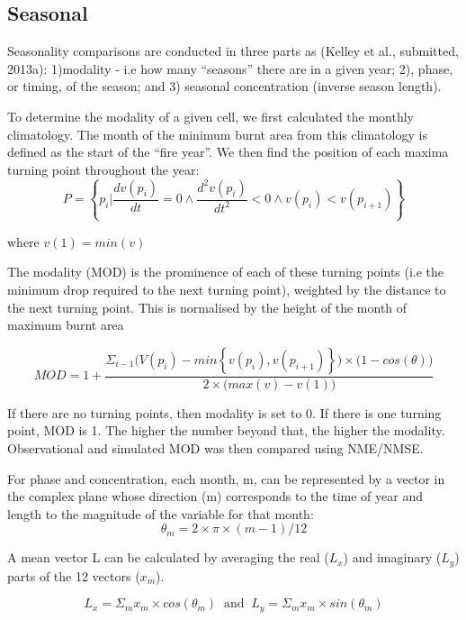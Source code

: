 \documentclass[bg, manuscript]{copernicus}
\begin{document}
\subsection{Seasonal}
Seasonality comparisons are conducted in three parts as  (Kelley et al., submitted, 2013a): 1)modality - i.e how many “seasons” there are in a given year; 2), phase, or timing, of the season; and 3) seasonal concentration (inverse season length).

To determine the modality of a given cell, we first calculated the monthly climatology. The month of the minimum burnt area from this climatology is defined as the start of the “fire year”. We then find the position of each maxima turning point throughout the year:	
\begin{equation}
    P = \left\{p_i | \frac{dv(p_i)}{dt} = 0 \wedge \frac{d^2v(p_i)}{dt^2} < 0 \wedge v(p_i) < v(p_{i+1}) \right\}
\end{equation}

where $v(1) = min(v)$

The modality (MOD) is the prominence of each of these turning points (i.e the minimum drop required to the next turning point), weighted by the distance to the next turning point. This is normalised by the height of the month of maximum burnt area

\begin{equation}
    MOD =1 + \frac{ \Sigma_{i-1} \big( V(p_i) - min\left\{ v(p_i), v(p_{i+1}) \right\} \big) \times \big( 1 - cos(\theta) \big)}{2 \times \big(max(v) - v(1) \big)}
\end{equation}

If there are no turning points, then modality is set to 0. If there is one turning point, MOD is 1. The higher the number beyond that, the higher the modality. Observational and simulated MOD  was then compared using NME/NMSE.

For phase and concentration, each month, m, can be represented by a vector in the complex plane whose direction (m) corresponds to the time of year and length to the magnitude of the variable for that month:
\begin{equation}
    \theta_m = 2 \times \pi \times (m-1) / 12
\end{equation}

A mean vector L can be calculated by averaging the real ($L_x$) and imaginary ($L_y$) parts of the 12 vectors ($x_m$).

\begin{equation}
    L_x = \Sigma_m x_m \times cos(\theta_m) \ \text{   and   } \
    L_y = \Sigma_m x_m \times sin(\theta_m)
\end{equation}
\end{document}
